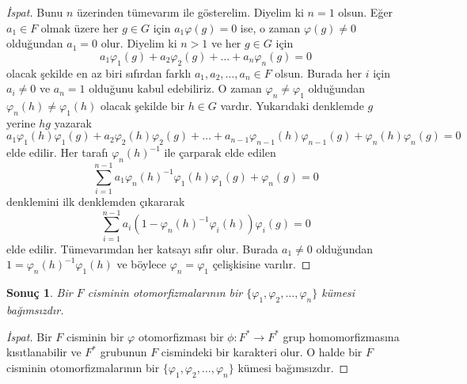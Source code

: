 \documentclass{article}
\newtheorem{cor}[thm]{Sonuç}
\theoremstyle{definition}
\theoremstyle{remark}
\begin{document}
    		\begin{proof}[İspat]
    	        Bunu $n$ üzerinden tümevarım ile gösterelim. Diyelim ki $n = 1$ olsun. Eğer $a_1 \in F$ olmak üzere her $g \in G$ için $a_1\varphi(g) = 0$ ise, o zaman $\varphi(g) \neq 0$ olduğundan $a_1 = 0$ olur. Diyelim ki $n > 1$ ve her $g \in G$ için
    	        \begin{equation*}
    	            a_1\varphi_1(g) + a_2\varphi_2(g) + \dots + a_n\varphi_n(g) = 0
    	        \end{equation*}
    	        olacak şekilde en az biri sıfırdan farklı $a_1, a_2, \dots, a_n \in F$ olsun. Burada her $i$ için $a_i \neq 0$ ve $a_n = 1$ olduğunu kabul edebiliriz. O zaman $\varphi_n \neq \varphi_1$ olduğundan $\varphi_n(h) \neq \varphi_1(h)$ olacak şekilde bir $h \in G$ vardır. Yukarıdaki denklemde $g$ yerine $hg$ yazarak
    	        \begin{equation*}
    	            a_1\varphi_1(h)\varphi_1(g) + a_2\varphi_2(h)\varphi_2(g) + \dots + a_{n - 1}\varphi_{n - 1}(h)\varphi_{n - 1}(g) + \varphi_n(h)\varphi_n(g) = 0
    	        \end{equation*}
    	        elde edilir. Her tarafı $\varphi_n(h)^{-1}$ ile çarparak elde edilen
    	        \begin{equation*}
    	            \sum_{i = 1}^{n - 1}{a_1\varphi_n(h)^{-1}\varphi_1(h)\varphi_1(g)} + \varphi_n(g)= 0
    	        \end{equation*}
    	        denklemini ilk denklemden çıkararak
    	        \begin{equation*}
    	            \sum_{i = 1}^{n - 1}{a_i(1 - \varphi_n(h)^{-1}\varphi_i(h))\varphi_i(g)} = 0
    	        \end{equation*}
    	        elde edilir. Tümevarımdan her katsayı sıfır olur. Burada $a_1 \neq 0$ olduğundan $1 = \varphi_n(h)^{-1}\varphi_1(h)$ ve böylece $\varphi_n = \varphi_1$ çelişkisine varılır.
    	    \end{proof}
    		
    		\begin{cor}
    		    Bir $F$ cisminin otomorfizmalarının bir $\{\varphi_1, \varphi_2, \dots, \varphi_n\}$ kümesi bağımsızdır.
    		\end{cor}
    		
    		\begin{proof}[İspat]
    	        Bir $F$ cisminin bir $\varphi$ otomorfizması bir $\phi: F^* \to F^*$ grup homomorfizmasına kısıtlanabilir ve $F^*$ grubunun $F$ cismindeki bir karakteri olur. O halde bir $F$ cisminin otomorfizmalarının bir $\{\varphi_1, \varphi_2, \dots, \varphi_n\}$ kümesi bağımsızdır.
    	    \end{proof}
    	    
\end{document}
